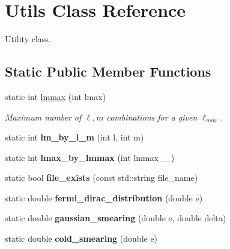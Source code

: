 \hypertarget{class_utils}{}\section{Utils Class Reference}
\label{class_utils}


Utility class.  


\subsection*{Static Public Member Functions}
\begin{DoxyCompactItemize}
\item 
static int \hyperlink{class_utils_a4c251a2107c4705d5cbd34204b0c8f43}{lmmax} (int lmax)
\begin{DoxyCompactList}\small\item\em Maximum number of $ \ell, m $ combinations for a given $ \ell_{max} $. \end{DoxyCompactList}\item 
\hypertarget{class_utils_a76563c31ab6d07447504d9f80e627d4f}{}static int {\bfseries lm\+\_\+by\+\_\+l\+\_\+m} (int l, int m)\label{class_utils_a76563c31ab6d07447504d9f80e627d4f}

\item 
\hypertarget{class_utils_acd96ebc7a29a7e833d7612b92db529d6}{}static int {\bfseries lmax\+\_\+by\+\_\+lmmax} (int lmmax\+\_\+\+\_\+)\label{class_utils_acd96ebc7a29a7e833d7612b92db529d6}

\item 
\hypertarget{class_utils_ab07b906a008493758a5181809763a796}{}static bool {\bfseries file\+\_\+exists} (const std\+::string file\+\_\+name)\label{class_utils_ab07b906a008493758a5181809763a796}

\item 
\hypertarget{class_utils_ab1b11c654bbd8f5b88e9ce21b6764e2a}{}static double {\bfseries fermi\+\_\+dirac\+\_\+distribution} (double e)\label{class_utils_ab1b11c654bbd8f5b88e9ce21b6764e2a}

\item 
\hypertarget{class_utils_a78f8129433092f0ff898f0393c9ff4b9}{}static double {\bfseries gaussian\+\_\+smearing} (double e, double delta)\label{class_utils_a78f8129433092f0ff898f0393c9ff4b9}

\item 
\hypertarget{class_utils_ac609670d145db57e02eec4bfe074937a}{}static double {\bfseries cold\+\_\+smearing} (double e)\label{class_utils_ac609670d145db57e02eec4bfe074937a}


\end{DoxyCompactItemize}
